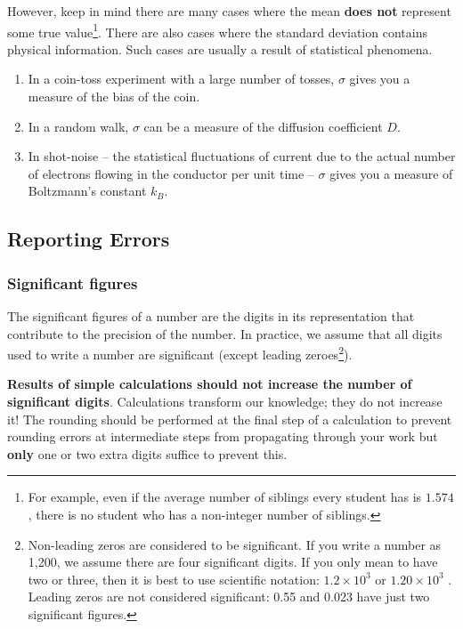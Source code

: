 However, keep in mind there are many cases where the mean  \textbf{does not} represent some true value\footnote{For example, even if the average number of siblings every student has is $1.574$, there is no student who has a non-integer number of siblings.}. There are also cases where the standard deviation contains physical information. Such cases are usually a result of statistical phenomena.

\begin{tip}
\begin{enumerate}
    \item In a coin-toss experiment with a large number of tosses, $\sigma$ gives you a measure of the bias of the coin.
    \item In a random walk, $\sigma$ can be a measure of the diffusion coefficient $D$.
    \item In shot-noise --  the statistical fluctuations of current due to the actual number of electrons flowing in the conductor per unit time -- $\sigma$ gives you a measure of Boltzmann's constant $k_B$.
\end{enumerate}
\end{tip}






\subsection{Reporting Errors}
\subsubsection{Significant figures}

The significant figures of a number are the digits in its representation that contribute to the precision of the number. In practice, we assume that all digits used to write a number are significant (except leading zeroes\footnote{Non-leading zeros are considered to be significant. If you write a number as 1,200, we assume there are four significant digits. If you only mean to have two or three, then it is best to use scientific notation: $1.2 \times 10^3$ or $1.20 \times 10^3$ . Leading zeros are not considered significant: 0.55 and 0.023 have just two significant figures.}).

\textbf{Results of simple calculations should not increase the number of significant digits}. Calculations transform our knowledge; they do not increase it! The rounding should be performed at the final step of a calculation to prevent rounding errors at intermediate steps from propagating through your work but \textbf{only} one or two
extra digits suffice to prevent this.

